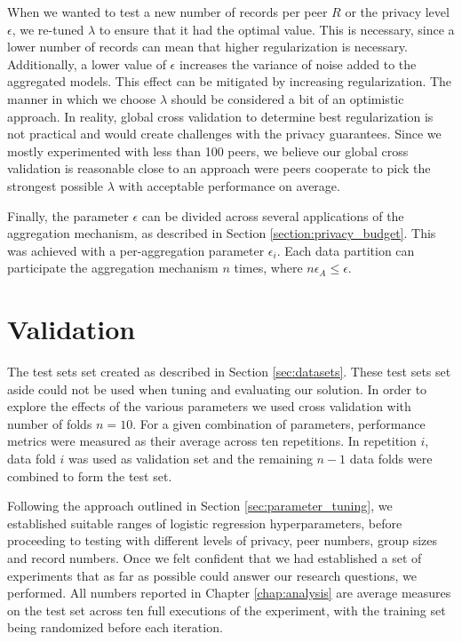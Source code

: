 When we wanted to test a new number of records per peer $R$ or the privacy level $\epsilon$, we re-tuned $\lambda$ to ensure that it had the optimal value. This is necessary, since a lower number of records can mean that higher regularization is necessary. Additionally, a lower value of $\epsilon$ increases the variance of noise added to the aggregated models. This effect can be mitigated by increasing regularization.  The manner in which we choose $\lambda$ should be considered a bit of an optimistic approach. In reality, global cross validation to determine best regularization is not practical and would create challenges with the privacy guarantees. Since we mostly experimented with less than 100 peers, we believe our global cross validation is reasonable close to an approach were peers cooperate to pick the strongest possible $\lambda$ with acceptable performance on average.

Finally, the parameter $\epsilon$ can be divided across several applications of the aggregation mechanism, as described in Section \ref{section:privacy_budget}. This was achieved with a per-aggregation parameter $\epsilon_i$. Each data partition can participate the aggregation mechanism $n$ times, where $n\epsilon_A \leq \epsilon$.


\section{Validation}

The test sets set created as described in Section \ref{sec:datasets}. These test sets set aside could not be used when tuning and evaluating our solution. In order to explore the effects of the various parameters we used cross validation with number of folds $n=10$. For a given combination of parameters, performance metrics were measured as their average across ten repetitions. In repetition $i$, data fold $i$ was used as validation set and the remaining $n-1$ data folds were combined to form the test set.

Following the approach outlined in Section \ref{sec:parameter_tuning}, we established suitable ranges of logistic regression hyperparameters, before proceeding to testing with different levels of privacy, peer numbers, group sizes and record numbers. Once we felt confident that we had established a set of experiments that as far as possible could answer our research questions, we performed. All numbers reported in Chapter \ref{chap:analysis} are average measures on the test set across ten full executions of the experiment, with the training set being randomized before each iteration.

